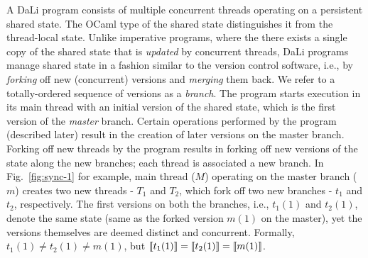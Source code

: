 A DaLi program consists of multiple concurrent threads operating on a
persistent shared state. The OCaml type of the shared state
distinguishes it from the thread-local state. Unlike imperative
programs, where the there exists a single copy of the shared state
that is \emph{updated} by concurrent threads, DaLi programs manage
shared state in a fashion similar to the version control software,
i.e., by \emph{forking} off new (concurrent) versions and
\emph{merging} them back. We refer to a totally-ordered sequence of
versions as a \emph{branch}. The program starts execution in its main
thread with an initial version of the shared state, which is the first
version of the \emph{master} branch. Certain operations performed by
the program (described later) result in the creation of later versions
on the master branch. Forking off new threads by the program results
in forking off new versions of the state along the new branches; each
thread is associated a new branch. In Fig.~\ref{fig:sync-1} for
example, main thread ($M$) operating on the master branch ($m$)
creates two new threads - $T_1$ and $T_2$, which fork off two new
branches - $t_1$ and $t_2$, respectively. The first versions on both
the branches, i.e., $t_1(1)$ and $t_2(1)$, denote the same state (same
as the forked version $m(1)$ on the master), yet the versions themselves
are deemed distinct and concurrent. Formally, $t_1(1) \neq t_2(1) \neq
m(1)$, but $\llbracket t_1(1) \rrbracket = \llbracket t_2(1) \rrbracket = \llbracket m(1) \rrbracket$.

